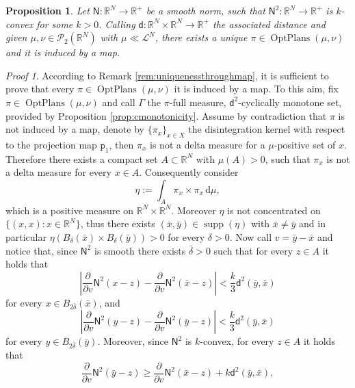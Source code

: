 \documentclass[11pt,twoside,a4paper]{article}
\DeclareMathOperator{\supp}{supp}
\newcommand{\modu}[1]{\left |#1\right |}
\newcommand{\Leb}{\mathscr{L}}
\newcommand{\R}{\mathbb{R}}
\newcommand{\p}{\mathtt p} %
\newcommand{\de}{\ensuremath{\, \mathrm d}} %
\newcommand{\thmsymbol}{\( \square \)}
\newcommand{\di}{\mathsf d} %
\DeclareMathOperator{\OptPlans}{OptPlans}
\newcommand{\ProbTwo}{\mathscr{P}_2}
\theoremstyle{theorem}
\newtheorem{prop}[theorem]{Proposition}
\theoremstyle{definition}
\theoremstyle{remark}
\theoremstyle{proof}
\newtheorem*{pro}{Proof}
\newenvironment{pr}{\begin{pro}%
 \renewcommand{\qedsymbol}{\thmsymbol}\pushQED{\qed}}%
 {\popQED\end{pro}}
\begin{document}
\begin{prop}\label{prop:strconvexnorm}
 Let $\mathsf N:\R^N \to \R^+$ be a smooth norm, such that $\mathsf N^2:\R^N  \to \R^+$ is $k$-convex for some $k>0$. Calling $\di: \R^N \times \R^N \to \R^+$ the associated distance and given $\mu,\nu \in \ProbTwo(\R^N)$ with $\mu\ll\Leb^N$, there exists a unique $\pi\in \OptPlans(\mu,\nu)$ and it is induced by a map.
\end{prop}

\begin{pr}
According to Remark \ref{rem:uniquenessthroughmap}, it is sufficient to prove that every $\pi\in \OptPlans(\mu,\nu)$ it is induced by a map. To this aim, fix $\pi\in \OptPlans(\mu,\nu)$ and call $\Gamma$ the $\pi$-full measure, $\di^2$-cyclically monotone set, provided by Proposition \ref{prop:cmonotonicity}. Assume by contradiction that $\pi$ is not induced by a map, denote by $\{\pi_x\}_{x\in X}$ the disintegration kernel with respect to the projection map $\p_1$, then $\pi_x$ is not a delta measure for a $\mu$-positive set of $x$. Therefore there exists a compact set $A\subset \R^N$ with $\mu(A)>0$, such that $\pi_x$ is not a delta measure for every $x\in A$. Consequently consider 
\begin{equation*}
    \eta := \int_A \pi_x \times \pi_x \de \mu,
\end{equation*}
which is a positive measure on $\R^N \times \R^N$. Moreover $\eta$ is not concentrated on $\{(x,x):x\in\R^N\}$, thus there exists $(\bar x, \bar y)\in \supp (\eta)$ with $\bar x \ne \bar y$ and in particular $\eta (B_\delta (\bar x)\times B_\delta (\bar y))>0$ for every $\delta>0$. Now call $v=\bar y - \bar x$ and notice that, since $\mathsf N^2$ is smooth there exists $\bar \delta >0$ such that for every $z \in A$ it holds that
\begin{equation*}
    \modu{\frac{\partial}{\partial v} \mathsf N^2 (x-z)-\frac{\partial}{\partial v} \mathsf N^2 (\bar x-z)} < \frac k3 \di^2 (\bar y, \bar x)
\end{equation*}
for every $x \in B_{2 \bar \delta}(\bar x)$, and 
\begin{equation*}
    \modu{\frac{\partial}{\partial v} \mathsf N^2 (y-z)-\frac{\partial}{\partial v} \mathsf N^2 (\bar y-z)} < \frac k3 \di^2 (\bar y, \bar x)
\end{equation*}
for every $y \in B_{2\bar \delta}(\bar y)$. Moreover, since $\mathsf N^2$ is $k$-convex, for every $z \in A$ it holds that 
\begin{equation*}
    \frac{\partial}{\partial v} \mathsf N^2 (\bar y-z) \geq \frac{\partial}{\partial v} \mathsf N^2 (\bar x-z) + k \di^2 (\bar y, \bar x),

\end{equation*}
\end{pr}
\end{document}
